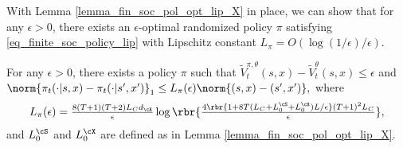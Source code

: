 \documentclass[9pt]{article}
\numberwithin{equation}{section}
\renewcommand{\frac}[2]{\tfrac{#1}{#2}}
\begin{document}
With Lemma \ref{lemma_fin_soc_pol_opt_lip_X} in place, we can show that for any $\epsilon>0$, there exists an $\epsilon$-optimal randomized policy $\pi$ satisfying \eqref{eq_finite_soc_policy_lip} with Lipschitz constant $L_\pi=O(\log(1/\epsilon)/\epsilon)$.

\begin{lemma} \label{lemma_close_to_opt_lip_policy_soc}
    For any $\epsilon > 0$, there exists a policy $\pi$ such that 
    $
            \tilde{V}^{\pi, \theta}_t(s,x) -  \tilde{V}^{ \theta}_t(s,x)  \leq \epsilon$ 
    and 
    $
    \norm{\pi_t(\cdot|s,x) -  \pi_t(\cdot|s',x') 
    }_1 
     \leq 
    L_\pi(\epsilon) \norm{(s,x) - (s',x')}, 
    $
where
\begin{align}\label{def_approx_smooth_policy_opt_soc}
    L_\pi(\epsilon) = \frac{8 (T+1)  (T+2) L_C d_{\cA} }{\epsilon}
    \log \rbr{
    \frac{4 \rbr{1 + 8T (L_C + L_0^\cS + L_0^\cX)L / \epsilon } (T+1)^2 L_C }{\epsilon }
    },
\end{align}
and $L_0^\cS$ and $L_0^\cX$ are defined as in Lemma \ref{lemma_fin_soc_pol_opt_lip_X}.
\end{lemma}
\end{document}
